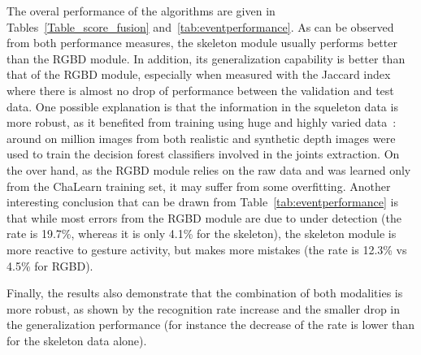 
%
The overal performance of the algorithms are given in Tables~\ref{Table_score_fusion} and~\ref{tab:eventperformance}.
%
As can be observed from both performance measures, the skeleton module usually  performs better than the RGBD module.
In addition, its generalization capability  is better than that of the RGBD module,
especially when measured with the Jaccard index where there is almost no drop of performance between the validation and test data.
%
One possible explanation is that the information in the squeleton data is more robust, as it benefited from training using huge and highly
varied data~\cite{shotton2011real}: around on million images from both realistic and synthetic depth images were used to train
the decision forest classifiers involved in the joints extraction.
%
On the over hand, as the  RGBD module relies on  the raw data and was learned only from the ChaLearn training set, it may
suffer from some overfitting.
%
Another interesting conclusion that can be drawn from Table~\ref{tab:eventperformance} is that while most errors from the RGBD module are due to under detection
(the \eventmissed rate is 19.7\%, whereas it is only 4.1\% for the skeleton), the skeleton module is more reactive to gesture activity, but makes more mistakes
(the \eventconfused rate is 12.3\% vs 4.5\% for RGBD).


Finally, the results also demonstrate  that the combination of both modalities is more robust,
as shown by the recognition rate increase and the smaller drop in the generalization performance
(for instance the decrease of the \eventaccuracy rate is lower than for the skeleton data alone).



